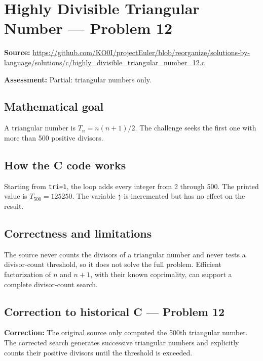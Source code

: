 \section{Highly Divisible Triangular Number --- Problem 12}
\label{prob:12}
\noindent\textbf{Source:} \url{https://github.com/KO0I/projectEuler/blob/reorganize/solutions-by-language/solutions/c/highly_divisible_triangular_number_12.c}

\noindent\textbf{Assessment:} Partial: triangular numbers only.

\subsection*{Mathematical goal}
A triangular number is \(T_n=n(n+1)/2\). The challenge seeks the first one with more than 500 positive divisors.

\subsection*{How the C code works}
Starting from \verb|tri=1|, the loop adds every integer from 2 through 500. The printed value is \(T_{500}=125250\). The variable \verb|j| is incremented but has no effect on the result.

\subsection*{Correctness and limitations}
The source never counts the divisors of a triangular number and never tests a divisor-count threshold, so it does not solve the full problem. Efficient factorization of \(n\) and \(n+1\), with their known coprimality, can support a complete divisor-count search.


\subsection*{Correction to historical C --- Problem 12}
{\color{red}\textbf{Correction:} The original source only computed the 500th triangular number. The corrected search generates successive triangular numbers and explicitly counts their positive divisors until the threshold is exceeded.}
